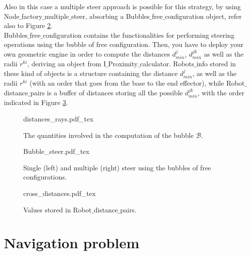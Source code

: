 Also in this case a multiple steer approach is possible for this strategy, by using Node$\_$factory$\_$multiple$\_$steer, absorbing a Bubbles$\_$free$\_$configuration object, refer also to Figure \ref{fig:bubbles}.
\\
Bubbles$\_$free$\_$configuration contains the functionalities for performing steering operations using the bubble of free configuration. Then, you have to deploy your own geometric engine in order to compute the distances $d^j_{min}$, $d^{jk}_{min}$ as well as the radii $r^{ki}$, deriving an object from I$\_$Proximity$\_$calculator.
Robots$\_$info stored in these kind of objects is a structure containing the distance $d^j_{min}$, as well as the radii $r^{ki}$ (with an order that goes from the base to the end effector), while Robot$\_$distance$\_$pairs is a buffer of distances storing all the possible $d^{jk}_{min}$, with the order indicated in Figure \ref{fig:cross_distances}.


 \begin{figure}
	 \centering
 \def\svgwidth{0.85 \columnwidth}
 {distances_rays.pdf_tex} 
	 \caption{The quantities involved in the computation of the bubble $\mathcal{B}$.}
 \label{fig:dist_ray}
 \end{figure}

 \begin{figure}
	 \centering
 \def\svgwidth{0.45 \columnwidth}
 {Bubble_steer.pdf_tex} 
	 \caption{Single (left) and multiple (right) steer using the bubbles of free configurations.}
 \label{fig:bubbles}
 \end{figure}


 \begin{figure}
	 \centering
 \def\svgwidth{0.45 \columnwidth}
 {cross_distances.pdf_tex} 
	 \caption{Values stored in Robot$\_$distance$\_$pairs.}
 \label{fig:cross_distances}
 \end{figure}


\section{Navigation problem}


